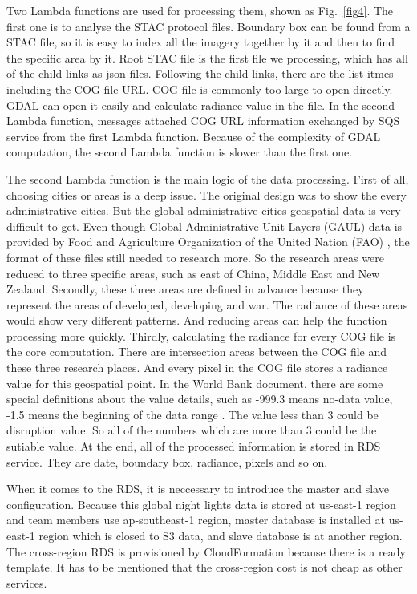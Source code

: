 \documentclass[conference]{IEEEtran}
\begin{document}
Two Lambda functions are used for processing them, shown as Fig.~\ref{fig4}. The first one is to analyse the STAC protocol files. Boundary box can be found from a STAC file, so it is easy to index
all the imagery together by it and then to find the specific area by it. Root STAC file is the first file we processing, which has all of the child links as json files. 
Following the child links, there are the list itmes including the COG file URL. COG file is commonly too large to open directly. GDAL can open it easily and calculate radiance 
value in the file. In the second Lambda function, messages attached COG URL information exchanged by SQS service from the first Lambda function. Because of the complexity 
of GDAL computation, the second Lambda function is slower than the first one.

The second Lambda function is the main logic of the data processing. First of all, choosing cities or areas is a deep issue. The original design was to show the every administrative 
cities. But the global administrative cities geospatial data is very difficult to get. Even though Global Administrative Unit Layers (GAUL) data is provided by Food and 
Agriculture Organization of the United Nation (FAO) \cite{GlobalAd98:online}, the format of these files still needed to research more. So the research areas were reduced 
to three specific areas, such as east of China, Middle East and New Zealand. Secondly, these three areas are defined in advance because they represent the areas of developed, 
developing and war. The radiance of these areas would show very different patterns. And reducing areas can help the function processing more quickly. Thirdly, calculating the 
radiance for every COG file is the core computation. There are intersection areas between the COG file and these three research places. And every pixel in the COG file stores 
a radiance value for this geospatial point. In the World Bank document, there are some special definitions about the value details, such as -999.3 means no-data value, -1.5 
means the beginning of the data range \cite{WorldBan13:online}. The value less than 3 could be disruption value. So all of the numbers which are more than 3 could be the 
sutiable value. At the end, all of the processed information is stored in RDS service. They are date, boundary box, radiance, pixels and so on.

When it comes to the RDS, it is neccessary to introduce the master and slave configuration. Because this global night lights data is stored at us-east-1 region and team members 
use ap-southeast-1 region, master database is installed at us-east-1 region which is closed to S3 data, and slave database is at another region. The cross-region RDS is 
provisioned by CloudFormation because there is a ready template. It has to be mentioned that the cross-region cost is not cheap as other services.
\end{document}
